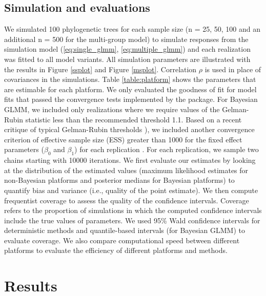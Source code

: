 \documentclass[12pt]{article}
\begin{document}
\subsection*{Simulation and evaluations}
We simulated 100 phylogenetic trees for each sample size (n = 25, 50, 100 and an additional n = 500 for the multi-group model) to simulate responses from the simulation model (\ref{eq:single_glmm}, \ref{eq:multiple_glmm}) and each realization was fitted to all model variants. 
All simulation parameters are illustrated with the results in Figure \ref{ssplot} and Figure \ref{msplot}. 
Correlation $\rho$ is used in place of covariances in the simulations.
Table \ref{table:platform} shows the parameters that are estimable for each platform. 
We only evaluated the goodness of fit for model fits that passed the convergence tests implemented by the package.
For Bayesian GLMM, we included only realizations where we require values of the Gelman-Rubin statistic less than the recommended threshold 1.1. Based on a recent critique of typical Gelman-Rubin thresholds \citep{vats2018revisiting}), we included another convergence criterion of effective sample size (ESS) greater than 1000 for the fixed effect parameters ($\beta_{0}$ and $\beta_{1}$) for each replication \citep{vehtari2019rank}. 
For each replication, we sample two chains starting with 10000 iterations. 
We first evaluate our estimates by looking at the distribution of the estimated values (maximum likelihood estimates for non-Bayesian platforms and posterior medians for Bayesian platforms) to quantify bias and variance (i.e., quality of the point estimate).
We then compute frequentist coverage to assess the quality of the confidence intervals.
Coverage refers to the proportion of simulations in which the computed confidence intervals include the true values of parameters.
We used 95\% Wald confidence intervals for deterministic methods and quantile-based intervals (for Bayesian GLMM) to evaluate coverage.
We also compare computational speed between different platforms to evaluate the efficiency of different platforms and methods. 

\section*{Results}
\end{document}

